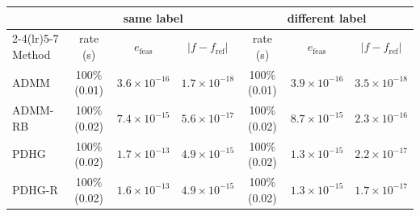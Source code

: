 \begin{tabular}{lcccccc}
\toprule
 & \multicolumn{3}{c}{same label} & \multicolumn{3}{c}{different label} \\
\cmidrule(lr){2-4}\cmidrule(lr){5-7}
Method & rate (s) & $e_{\mathrm{feas}}$ & $|f-f_{\mathrm{ref}}|$ & rate (s) & $e_{\mathrm{feas}}$ & $|f-f_{\mathrm{ref}}|$ \\
\midrule
ADMM & 100\% (0.01) & $3.6{\times}10^{-16}$ & $1.7{\times}10^{-18}$ & 100\% (0.01) & $3.9{\times}10^{-16}$ & $3.5{\times}10^{-18}$ \\
ADMM-RB & 100\% (0.02) & $7.4{\times}10^{-15}$ & $5.6{\times}10^{-17}$ & 100\% (0.02) & $8.7{\times}10^{-15}$ & $2.3{\times}10^{-16}$ \\
PDHG & 100\% (0.02) & $1.7{\times}10^{-13}$ & $4.9{\times}10^{-15}$ & 100\% (0.02) & $1.3{\times}10^{-15}$ & $2.2{\times}10^{-17}$ \\
PDHG-R & 100\% (0.02) & $1.6{\times}10^{-13}$ & $4.9{\times}10^{-15}$ & 100\% (0.02) & $1.3{\times}10^{-15}$ & $1.7{\times}10^{-17}$ \\
\bottomrule
\end{tabular}